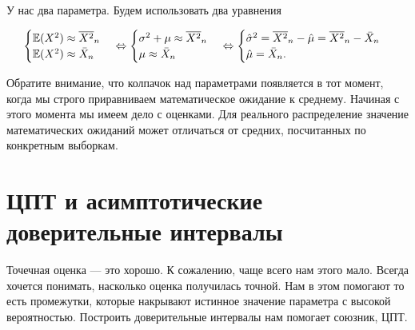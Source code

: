 \documentclass[12pt, a4paper, oneside]{article}
\begin{document}
\begin{sol}
У нас два параметра. Будем использовать два уравнения

\[
\begin{cases} 
\mathbb{E}(X^2) \approx \overline{X^2}_n   \\
\mathbb{E}(X^2) \approx  \bar{X}_n 
\end{cases} \Leftrightarrow \begin{cases} 
\sigma^2 + \mu \approx \overline{X^2}_n   \\
 \mu \approx \bar{X}_n
\end{cases}  \Leftrightarrow \begin{cases} 
 \hat{\sigma}^2 = \overline{X^2}_n - \hat{\mu} = \overline{X^2}_n - \bar{X}_n \\
\hat{\mu} = \bar{X}_n.
\end{cases}
\]

Обратите внимание, что колпачок над параметрами появляется в тот момент, когда мы строго приравниваем математическое ожидание к среднему. Начиная с этого момента мы имеем дело с оценками. Для реального распределение значение математических ожиданий может отличаться от средних, посчитанных по конкретным выборкам. 
\end{sol} 






\section{ЦПТ и асимптотические доверительные интервалы}

Точечная оценка --- это хорошо. К сожалению, чаще всего нам этого мало. Всегда хочется понимать, насколько оценка получилась точной. Нам в этом помогают  то есть промежутки, которые накрывают истинное значение параметра с высокой вероятностью. Построить доверительные интервалы нам помогает союзник, ЦПТ.
\end{document}
